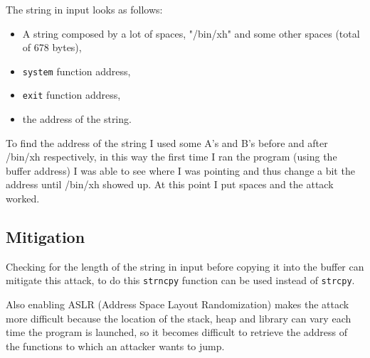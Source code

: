 \documentclass[a4paper,12pt]{article}
\begin{document}
The string in input looks as follows:
\begin{itemize}

\item A string composed by a lot of spaces, "/bin/xh" and some other spaces (total of 678 bytes),
\item \texttt{system} function address,
\item \texttt{exit} function address,
\item the address of the string.

\end{itemize}

To find the address of the string I used some A's and B's before and after /bin/xh respectively, in this way the first time I ran the program (using the buffer address) I was able to see where I was pointing and thus change a bit the address until /bin/xh showed up. At this point I put spaces and the attack worked.







\subsection{Mitigation}

Checking for the length of the string in input before copying it into the buffer can mitigate this attack, to do this \texttt{strncpy} function can be used instead of \texttt{strcpy}.

Also enabling ASLR (Address Space Layout Randomization) makes the attack more difficult because the location of the stack, heap and library can vary each time the program is launched, so it becomes difficult to retrieve the address of the functions to which an attacker wants to jump.
\end{document}
